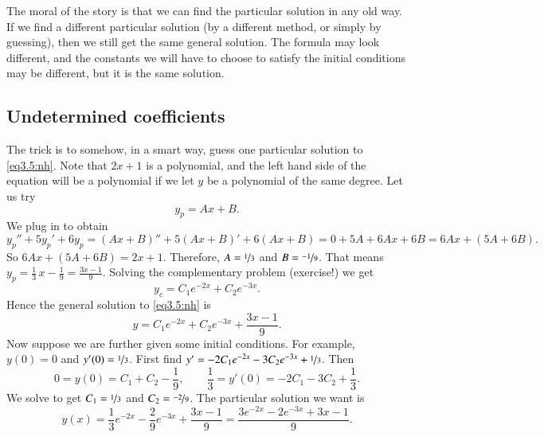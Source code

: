 \documentclass[12pt]{book}
\begin{document}
The moral of the story is that we can find the particular solution in any old
way.  If we find a different particular solution (by a different method,
or simply by guessing),
then we still get the same general solution.
The formula may 
look different, and the constants we will have to choose to
satisfy
the initial conditions may be different, but it is the same solution.

\subsection{Undetermined coefficients}

The trick is to somehow, in a smart way, guess one particular solution to
\eqref{eq3.5:nh}.  Note that $2x+1$ is a polynomial, and the left hand 
side of the equation will be a polynomial if we let $y$ be a polynomial of
the same degree.  Let us try
\begin{equation*}
y_p = Ax + B .
\end{equation*}
We plug in to obtain
\begin{equation*}
y_p'' + 5y_p'+ 6y_p =
(Ax+B)'' + 5(Ax+B)' + 6(Ax+B) = 
0 + 5A + 6Ax + 6B = 6Ax+ (5A+6B) .
\end{equation*}
So $6Ax+(5A+6B) = 2x+1$.  Therefore, $A = \nicefrac{1}{3}$ and $B = \nicefrac{-1}{9}$.
That means
$y_p = \frac{1}{3}\, x - \frac{1}{9} = \frac{3x-1}{9}$.
Solving the complementary
problem (exercise!) we get
\begin{equation*}
y_c = C_1 e^{-2x} + C_2 e^{-3x}.
\end{equation*}
Hence the general solution to \eqref{eq3.5:nh} is
\begin{equation*}
y = C_1 e^{-2x} + C_2 e^{-3x} + \frac{3x-1}{9} .
\end{equation*}
Now suppose we are further given some initial conditions.  For example, $y(0) = 0$ and
$y'(0) = \nicefrac{1}{3}$.  First find $y' = - 2C_1 e^{-2x} - 3C_2 e^{-3x}
+ \nicefrac{1}{3}$.
Then
\begin{equation*}
0 = y(0) = C_1 + C_2 -\frac{1}{9} , \qquad
\frac{1}{3} = y'(0) = - 2C_1 - 3C_2 + \frac{1}{3} .
\end{equation*}
We solve to get $C_1 = \nicefrac{1}{3}$ and $C_2 = \nicefrac{-2}{9}$.
The particular solution we want is
\begin{equation*}
y(x) = \frac{1}{3} e^{-2x} - \frac{2}{9} e^{-3x} + \frac{3x-1}{9} =
\frac{3 e^{-2x} - 2 e^{-3x} + 3x-1}{9} .
\end{equation*}
\end{document}
